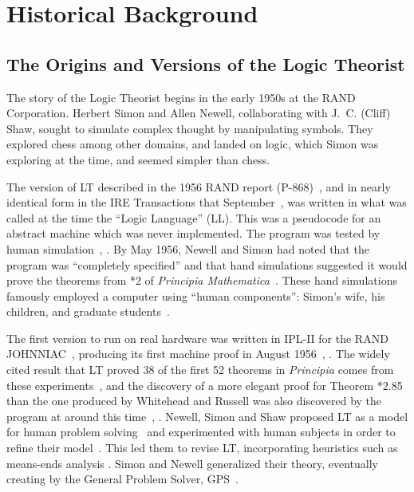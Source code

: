 \documentclass[journal]{IEEEtran}
\begin{document}
\section{Historical Background}
\label{sec:history}

\subsection{The Origins and Versions of the Logic Theorist}

The story of the Logic Theorist begins in the early 1950s at the RAND
Corporation. Herbert Simon and Allen Newell, collaborating with
J.~C. (Cliff) Shaw, sought to simulate complex thought by manipulating
symbols. They explored chess among other domains, and landed on 
logic, which Simon was exploring at the time, and seemed simpler than chess.

The version of LT described in the 1956 RAND report
(P-868)~\cite{LT1956a,LT1956b}, and in nearly identical form in the
IRE Transactions that September~\cite{LT1956c}, was written in what
was called at the time the ``Logic Language'' (LL).  This was a
pseudocode for an abstract machine which was never implemented. The program
was tested  by human simulation~\cite[Ch.~13]{simon1996models}, 
\cite[p.~xx]{newell1964ipl}. By May
1956, Newell and Simon had noted that the program was ``completely
specified'' and that hand simulations suggested it would prove the
theorems from *2 of \textit{Principia
Mathematica}~\cite[p.~18]{cip1956}.  These hand simulations famously
employed a computer using ``human components'': Simon's wife, his children, and
graduate students~\cite[Ch.~13]{simon1996models}.

The first version to run on real hardware was written in IPL-II for
the RAND JOHNNIAC~\cite{newellshaw1957},
producing its first machine proof in August
1956~\cite[Ch.~13]{simon1996models}, \cite{newellshaw1957}. The widely cited result
that LT proved 38 of the first 52 theorems in \textit{Principia} comes 
from these experiments~\cite{LT1957}, and
the discovery of a more elegant proof for Theorem *2.85 than the 
one produced by Whitehead and Russell was also discovered by the program at around this 
time~\cite[Ch.~13]{simon1996models}, \cite{cip8jan1958}.
Newell, Simon and Shaw proposed LT as a model 
for human problem solving~\cite{HPS1958}
and experimented with human subjects in order to refine
their model~\cite{PCT1959}. This led them to revise
LT, incorporating heuristics such as means-ends
analysis \cite{PCT1959}. Simon and Newell generalized their theory, eventually
creating by the General Problem Solver,
GPS~\cite[p.~19]{SHT1959}.
\end{document}
